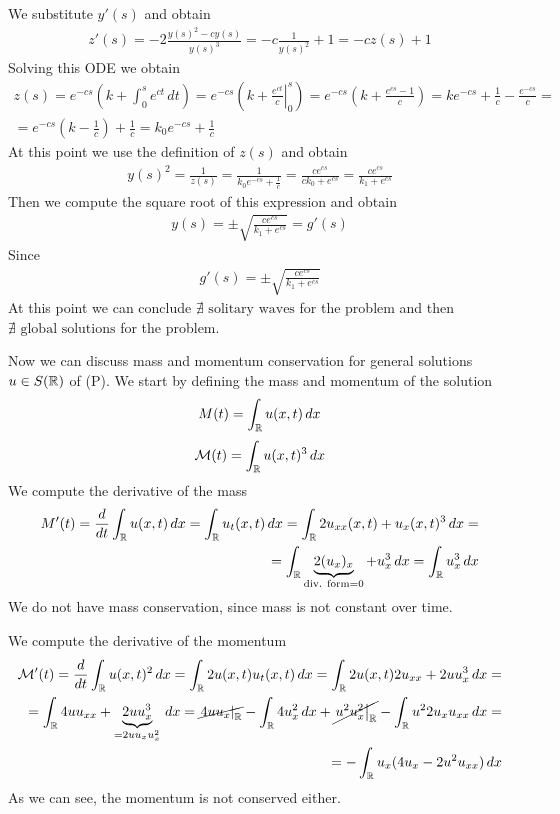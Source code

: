 We substitute \(y'(s)\) and obtain
\[
    \begin{split}
        z'(s) = -2 \frac{y(s)^2 - cy(s)}{y(s)^3} = -c \frac{1}{y(s)^2} + 1 = -c z(s) + 1
    \end{split}
\]
Solving this ODE we obtain
\[
    \begin{split}
        z(s) = e^{-cs} \left(k + \int_0^s e^{ct} \, dt\right) = e^{-cs} \left(k + \left. \frac{e^{ct}}{c} \right|_0^s\right) = e^{-cs} \left(k + \frac{e^{cs} - 1}{c}\right) = k e^{-cs} + \frac{1}{c} - \frac{e^{-cs}}{c} = \\
        = e^{-cs} \left(k - \frac{1}{c}\right) + \frac{1}{c} = k_0 e^{-cs} + \frac{1}{c}
    \end{split}
\]
At this point we use the definition of \(z(s)\) and obtain
\[
    \begin{split}
        y(s)^2 = \frac{1}{z(s)} = \frac{1}{k_0 e^{-cs} + \frac{1}{c}} = \frac{c e^{cs}}{c k_0 + e^{cs}} = \frac{c e^{cs}}{k_1 + e^{cs}}
    \end{split}
\]
Then we compute the square root of this expression and obtain
\[
    \begin{split}
        y(s) = \pm \sqrt{\frac{c e^{cs}}{k_1 + e^{cs}}} = g'(s)
    \end{split}
\]
Since 
\[
    \begin{split}
        g'(s) = \pm \sqrt{\frac{c e^{cs}}{k_1 + e^{cs}}} 
    \end{split}
\]
At this point we can conclude \(\nexists \text{ solitary waves}\) for the problem and then \(\nexists \text{ global solutions}\) for the problem.

Now we can discuss mass and momentum conservation for general solutions \(u \in S(\mathbb{R})\) of (P). We start by defining the mass and momentum of the solution
\[
    M(t) = \int_{\mathbb{R}} u(x,t) \, dx
\]
\[
    \mathcal{M}(t) = \int_{\mathbb{R}} u(x,t)^3 \, dx
\]
We compute the derivative of the mass
\[
    \begin{split}
        M'(t) = \frac{d}{dt} \int_{\mathbb{R}} u(x,t) \, dx = \int_{\mathbb{R}} u_t(x,t) \, dx = \int_{\mathbb{R}} 2u_{xx}(x,t) + u_x(x,t)^3 \, dx =\\ 
        = \int_{\mathbb{R}} \underbrace{2(u_x)_x}_{\text{div. form} = 0} + u_x^3 \, dx = \int_{\mathbb{R}} u_x^3 \, dx
    \end{split}
\]
We do not have mass conservation, since mass is not constant over time. 

We compute the derivative of the momentum
\[
    \begin{split}
        \mathcal{M}'(t) = \frac{d}{dt} \int_{\mathbb{R}} u(x,t)^2 \, dx = \int_{\mathbb{R}} 2 u(x,t) u_t(x,t) \, dx = \int_{\mathbb{R}} 2 u(x,t) 2u_{xx} + 2u u_x^3 \, dx= \\
         = \int_{\mathbb{R}} 4 u u_{xx} + \underbrace{2u u_x^3}_{= 2 u u_x u_x^2} \, dx =  \cancel{\left. 4 u u_x \right|_{\mathbb{R}}} - \int_{\mathbb{R}} 4 u_x^2 \, dx + \cancel{\left. u^2 u_x^2 \right|_{\mathbb{R}}} - \int_{\mathbb{R}} u^2 2 u_x u_{xx} \, dx =\\
         = - \int_{\mathbb{R}} u_x (4 u_x - 2 u^2 u_{xx}) \, dx
    \end{split}
\]
As we can see, the momentum is not conserved either.

